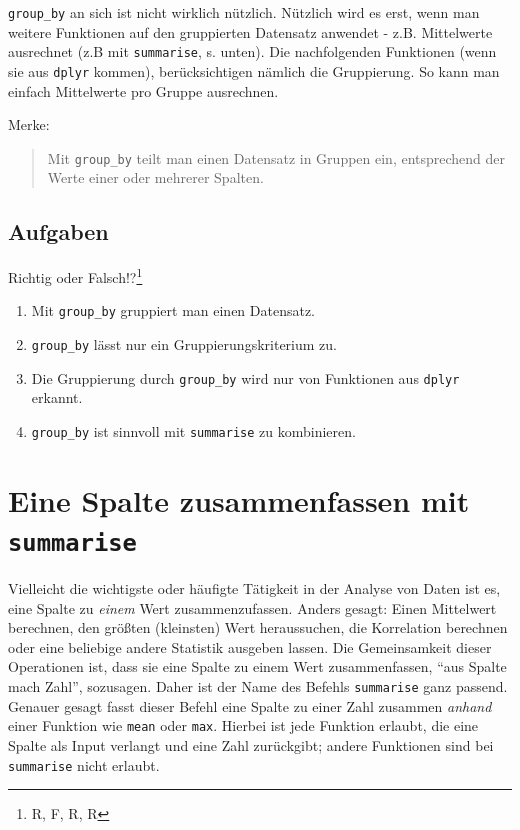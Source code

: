 \documentclass[12pt,ngerman,paper=a4,pagesize,DIV=13]{scrreprt}
\providecommand{\tightlist}{%
  \setlength{\itemsep}{0pt}\setlength{\parskip}{0pt}}
\begin{document}
\texttt{group\_by} an sich ist nicht wirklich nützlich. Nützlich wird es
erst, wenn man weitere Funktionen auf den gruppierten Datensatz anwendet
- z.B. Mittelwerte ausrechnet (z.B mit \texttt{summarise}, s. unten).
Die nachfolgenden Funktionen (wenn sie aus \texttt{dplyr} kommen),
berücksichtigen nämlich die Gruppierung. So kann man einfach Mittelwerte
pro Gruppe ausrechnen.

Merke:

\begin{quote}
Mit \texttt{group\_by} teilt man einen Datensatz in Gruppen ein,
entsprechend der Werte einer oder mehrerer Spalten.
\end{quote}

\hypertarget{aufgaben-3}{%
\subsection{Aufgaben}\label{aufgaben-3}}

Richtig oder Falsch!?\footnote{R, F, R, R}

\begin{enumerate}
\def\labelenumi{\arabic{enumi}.}
\tightlist
\item
  Mit \texttt{group\_by} gruppiert man einen Datensatz.
\item
  \texttt{group\_by} lässt nur ein Gruppierungskriterium zu.
\item
  Die Gruppierung durch \texttt{group\_by} wird nur von Funktionen aus
  \texttt{dplyr} erkannt.
\item
  \texttt{group\_by} ist sinnvoll mit \texttt{summarise} zu kombinieren.
\end{enumerate}

\hypertarget{eine-spalte-zusammenfassen-mit-summarise}{%
\section{\texorpdfstring{Eine Spalte zusammenfassen mit
\texttt{summarise}}{Eine Spalte zusammenfassen mit summarise}}\label{eine-spalte-zusammenfassen-mit-summarise}}

Vielleicht die wichtigste oder häufigte Tätigkeit in der Analyse von
Daten ist es, eine Spalte zu \emph{einem} Wert zusammenzufassen. Anders
gesagt: Einen Mittelwert berechnen, den größten (kleinsten) Wert
heraussuchen, die Korrelation berechnen oder eine beliebige andere
Statistik ausgeben lassen. Die Gemeinsamkeit dieser Operationen ist,
dass sie eine Spalte zu einem Wert zusammenfassen, \enquote{aus Spalte
mach Zahl}, sozusagen. Daher ist der Name des Befehls \texttt{summarise}
ganz passend. Genauer gesagt fasst dieser Befehl eine Spalte zu einer
Zahl zusammen \emph{anhand} einer Funktion wie \texttt{mean} oder
\texttt{max}. Hierbei ist jede Funktion erlaubt, die eine Spalte als
Input verlangt und eine Zahl zurückgibt; andere Funktionen sind bei
\texttt{summarise} nicht erlaubt.
\end{document}
